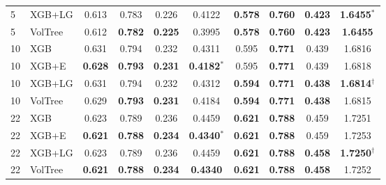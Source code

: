 \documentclass[runningheads,a4paper]{llncs}
\begin{document}
\begin{table}[t]
\begin{tabular}{ll cccc cccc}
5 & XGB+LG   & 0.613 & 0.783 & 0.226 & 0.4122 & \textbf{0.578} & \textbf{0.760} & \textbf{0.423} & \textbf{1.6455$^{*}$} \\
5 & VolTree  & 0.612 & \textbf{0.782} & \textbf{0.225} & 0.3995 & \textbf{0.578} & \textbf{0.760} & \textbf{0.423} & \textbf{1.6455} \\
\midrule
10 & XGB      & 0.631 & 0.794 & 0.232 & 0.4311 & 0.595 & \textbf{0.771} & 0.439 & 1.6816 \\
10 & XGB+E    & \textbf{0.628} & \textbf{0.793} & \textbf{0.231} & \textbf{0.4182$^{*}$} & 0.595 & \textbf{0.771} & 0.439 & 1.6818 \\
10 & XGB+LG   & 0.631 & 0.794 & 0.232 & 0.4312 & \textbf{0.594} & \textbf{0.771} & \textbf{0.438} & \textbf{1.6814$^{\dagger}$} \\
10 & VolTree  & 0.629 & \textbf{0.793} & \textbf{0.231} & 0.4184 & \textbf{0.594} & \textbf{0.771} & \textbf{0.438} & 1.6815 \\
\midrule
22 & XGB      & 0.623 & 0.789 & 0.236 & 0.4459 & \textbf{0.621} & \textbf{0.788} & 0.459 & 1.7251 \\
22 & XGB+E    & \textbf{0.621} & \textbf{0.788} & \textbf{0.234} & \textbf{0.4340$^{*}$} & \textbf{0.621} & \textbf{0.788} & 0.459 & 1.7253 \\
22 & XGB+LG   & 0.623 & 0.789 & 0.236 & 0.4459 & \textbf{0.621} & \textbf{0.788} & \textbf{0.458} & \textbf{1.7250$^{\dagger}$} \\
22 & VolTree  & \textbf{0.621} & \textbf{0.788} & \textbf{0.234} & \textbf{0.4340} & \textbf{0.621} & \textbf{0.788} & \textbf{0.458} & 1.7252 \\
\bottomrule
\end{tabular}
\end{table}
\end{document}
